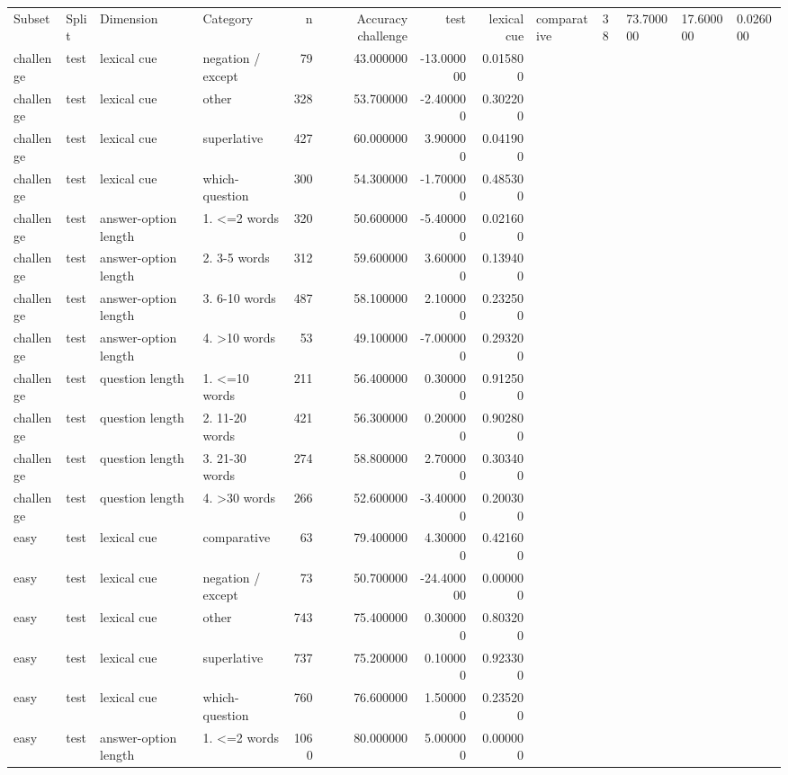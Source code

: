 \begin{tabular}{llllrrrr}
\toprule
Subset & Split & Dimension & Category & n & Accuracy %
\midrule
challenge & test & lexical cue & comparative & 38 & 73.700000 & 17.600000 & 0.026000 \\
challenge & test & lexical cue & negation / except & 79 & 43.000000 & -13.000000 & 0.015800 \\
challenge & test & lexical cue & other & 328 & 53.700000 & -2.400000 & 0.302200 \\
challenge & test & lexical cue & superlative & 427 & 60.000000 & 3.900000 & 0.041900 \\
challenge & test & lexical cue & which-question & 300 & 54.300000 & -1.700000 & 0.485300 \\
challenge & test & answer-option length & 1. <=2 words & 320 & 50.600000 & -5.400000 & 0.021600 \\
challenge & test & answer-option length & 2. 3-5 words & 312 & 59.600000 & 3.600000 & 0.139400 \\
challenge & test & answer-option length & 3. 6-10 words & 487 & 58.100000 & 2.100000 & 0.232500 \\
challenge & test & answer-option length & 4. >10 words & 53 & 49.100000 & -7.000000 & 0.293200 \\
challenge & test & question length & 1. <=10 words & 211 & 56.400000 & 0.300000 & 0.912500 \\
challenge & test & question length & 2. 11-20 words & 421 & 56.300000 & 0.200000 & 0.902800 \\
challenge & test & question length & 3. 21-30 words & 274 & 58.800000 & 2.700000 & 0.303400 \\
challenge & test & question length & 4. >30 words & 266 & 52.600000 & -3.400000 & 0.200300 \\
easy & test & lexical cue & comparative & 63 & 79.400000 & 4.300000 & 0.421600 \\
easy & test & lexical cue & negation / except & 73 & 50.700000 & -24.400000 & 0.000000 \\
easy & test & lexical cue & other & 743 & 75.400000 & 0.300000 & 0.803200 \\
easy & test & lexical cue & superlative & 737 & 75.200000 & 0.100000 & 0.923300 \\
easy & test & lexical cue & which-question & 760 & 76.600000 & 1.500000 & 0.235200 \\
easy & test & answer-option length & 1. <=2 words & 1060 & 80.000000 & 5.000000 & 0.000000 \\

\end{tabular}
